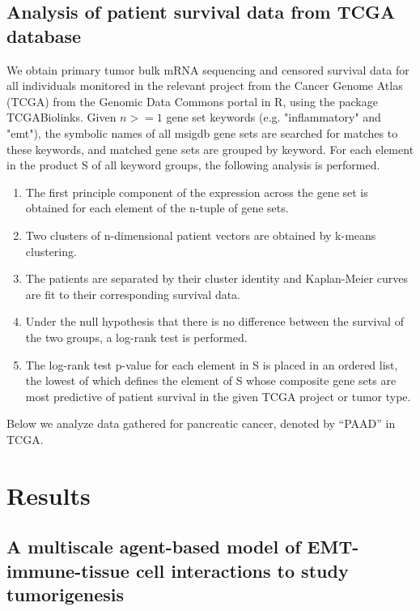 \documentclass[11pt]{article}
\begin{document}
\subsection{Analysis of patient survival data from TCGA database}
We obtain primary tumor bulk mRNA sequencing and censored survival data for all individuals monitored in the relevant project from the Cancer Genome Atlas (TCGA) from the Genomic Data Commons portal in R, using the package TCGABiolinks.  Given $n >= 1$ gene set keywords (e.g. "inflammatory" and "emt"), the symbolic names of all msigdb gene sets are searched for matches to these keywords, and matched gene sets are grouped by keyword. For each element in the product S of all keyword groups, the following analysis is performed.
\begin{enumerate}
     \item The first principle component of the expression across the gene set is obtained for each element of the n-tuple of gene sets.
     \item Two clusters of n-dimensional patient vectors are obtained by k-means clustering.
     \item The patients are separated by their cluster identity and Kaplan-Meier curves are fit to their corresponding survival data.
     \item Under the null hypothesis that there is no difference between the survival of the two groups, a log-rank test is performed.
     \item The log-rank test p-value for each element in S is placed in an ordered list, the lowest of which defines the element of S whose composite gene sets are most predictive of patient survival in the given TCGA project or tumor type.
\end{enumerate}
Below we analyze data gathered for pancreatic cancer, denoted by ``PAAD'' in TCGA.     


\section{Results}

\subsection{A multiscale agent-based model of EMT-immune-tissue cell interactions to study tumorigenesis}\label{ExplModel}
\end{document}

